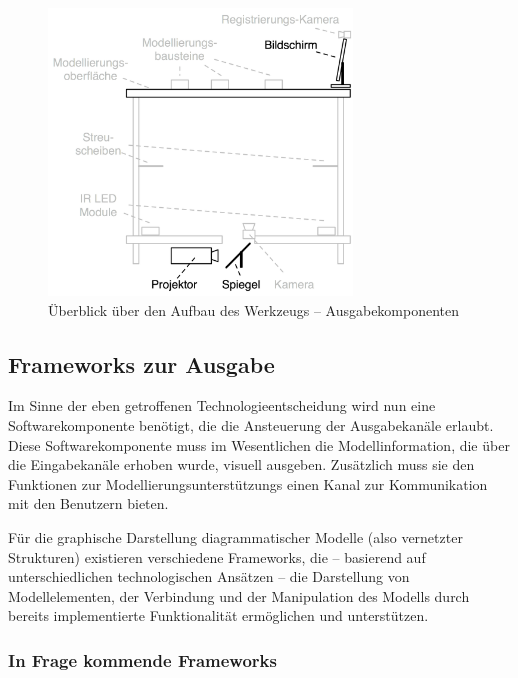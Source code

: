 \begin{figure}[htbp]
	\centering
		\includegraphics[height=3in]{img/ImplementierungInput/TischSeitenansichtOutput.png}
	\caption{Überblick über den Aufbau des Werkzeugs -- Ausgabekomponenten}
	\label{fig:img_ImplementierungInput_TischSeitenansichtOutput}
\end{figure}


\subsection{Frameworks zur Ausgabe} %
\label{sub:frameworks_zur_ausgabe}

Im Sinne der eben getroffenen Technologieentscheidung wird nun eine Softwarekomponente benötigt, die die Ansteuerung der Ausgabekanäle erlaubt. Diese Softwarekomponente muss im Wesentlichen die Modellinformation, die über die Eingabekanäle erhoben wurde, visuell ausgeben. Zusätzlich muss sie den Funktionen zur Modellierungsunterstützungs einen Kanal zur Kommunikation mit den Benutzern bieten.

Für die graphische Darstellung diagrammatischer Modelle (also vernetzter Strukturen) existieren verschiedene Frameworks, die -- basierend auf unterschiedlichen technologischen Ansätzen -- die Darstellung von Modellelementen, der Verbindung und der Manipulation des Modells durch bereits implementierte Funktionalität ermöglichen und unterstützen. 

\subsubsection{In Frage kommende Frameworks} %
\label{ssub:in_frage_kommende_frameworks}

